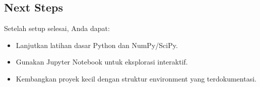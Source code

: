 \subsection{Next Steps}

Setelah setup selesai, Anda dapat:
\begin{itemize}
    \item Lanjutkan latihan dasar Python dan NumPy/SciPy.
    \item Gunakan Jupyter Notebook untuk eksplorasi interaktif.
    \item Kembangkan proyek kecil dengan struktur environment yang terdokumentasi.
\end{itemize}
